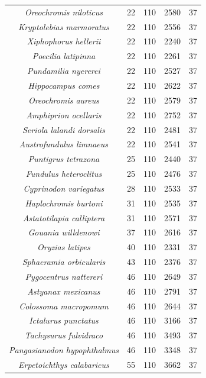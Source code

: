 \begin{longtable}[c]{|c|c|c|c|c|}
\textit{Oreochromis niloticus}         & 22  & 110 & 2580 & 37 \\
\textit{Kryptolebias marmoratus}       & 22  & 110 & 2556 & 37 \\
\textit{Xiphophorus hellerii}          & 22  & 110 & 2240 & 37 \\
\textit{Poecilia latipinna}            & 22  & 110 & 2261 & 37 \\
\textit{Pundamilia nyererei}           & 22  & 110 & 2527 & 37 \\
\textit{Hippocampus comes}             & 22  & 110 & 2622 & 37 \\
\textit{Oreochromis aureus}            & 22  & 110 & 2579 & 37 \\
\textit{Amphiprion ocellaris}          & 22  & 110 & 2752 & 37 \\
\textit{Seriola lalandi dorsalis}      & 22  & 110 & 2481 & 37 \\
\textit{Austrofundulus limnaeus}       & 22  & 110 & 2541 & 37 \\
\textit{Puntigrus tetrazona}           & 25  & 110 & 2440 & 37 \\
\textit{Fundulus heteroclitus}         & 25  & 110 & 2476 & 37 \\
\textit{Cyprinodon variegatus}         & 28  & 110 & 2533 & 37 \\
\textit{Haplochromis burtoni}          & 31  & 110 & 2535 & 37 \\
\textit{Astatotilapia calliptera}      & 31  & 110 & 2571 & 37 \\
\textit{Gouania willdenowi}            & 37  & 110 & 2616 & 37 \\
\textit{Oryzias latipes}               & 40  & 110 & 2331 & 37 \\
\textit{Sphaeramia orbicularis}        & 43  & 110 & 2376 & 37 \\
\textit{Pygocentrus nattereri}         & 46  & 110 & 2649 & 37 \\
\textit{Astyanax mexicanus}            & 46  & 110 & 2791 & 37 \\
\textit{Colossoma macropomum}          & 46  & 110 & 2644 & 37 \\
\textit{Ictalurus punctatus}           & 46  & 110 & 3166 & 37 \\
\textit{Tachysurus fulvidraco}         & 46  & 110 & 3493 & 37 \\
\textit{Pangasianodon hypophthalmus}   & 46  & 110 & 3348 & 37 \\
\textit{Erpetoichthys calabaricus}     & 55  & 110 & 3662 & 37 \\

\end{longtable}
